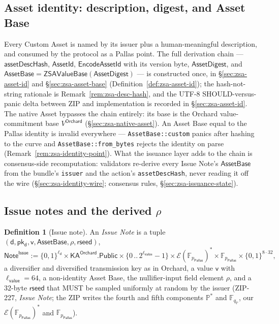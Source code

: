 \documentclass[11pt,a4paper]{article}
\theoremstyle{definition}
\newtheorem{definition}[theorem]{Definition}
\newcommand{\F}{\mathbb{F}}
\newcommand{\Pallas}{\ensuremath{\mathsf{Pallas}}}
\newcommand{\Ep}{\ensuremath{\mathcal{E}}}
\newcommand{\pkd}{\ensuremath{\mathsf{pk_d}}}
\begin{document}
\subsection{Asset identity: description, digest, and Asset Base}%
\label{sec:zsa-issuance-asset}

Every Custom Asset is named by its issuer plus a human-meaningful
description, and consumed by the protocol as a Pallas point. The full
derivation chain --- $\mathsf{assetDescHash}$, $\mathsf{AssetId}$,
$\mathsf{EncodeAssetId}$ with its version byte, $\mathsf{AssetDigest}$,
and $\mathsf{AssetBase} = \mathsf{ZSAValueBase}(\mathsf{AssetDigest})$ ---
is constructed once, in \S\ref{sec:zsa-asset-id} and
\S\ref{sec:zsa-asset-base} (Definition~\ref{def:zsa-asset-id}); the
hash-not-string rationale is Remark~\ref{rem:zsa-desc-hash}, and the UTF-8
SHOULD-versus-panic delta between ZIP and implementation is recorded in
\S\ref{sec:zsa-asset-id}. The native Asset bypasses the chain entirely:
its base is the Orchard value-commitment base $V^{\mathsf{Orchard}}$
(\S\ref{sec:zsa-native-asset}). An Asset Base equal to the Pallas identity
is invalid everywhere --- \texttt{AssetBase::custom} panics after hashing
to the curve and \texttt{AssetBase::from\_bytes} rejects the identity on
parse (Remark~\ref{rem:zsa-identity-point}). What the issuance layer adds
to the chain is consensus-side recomputation: validators re-derive every
Issue Note's $\mathsf{AssetBase}$ from the bundle's \texttt{issuer} and
the action's \texttt{assetDescHash}, never reading it off the wire
(\S\ref{sec:zsa-identity-wire}; consensus rules,
\S\ref{sec:zsa-issuance-state}).

\subsection{Issue notes and the derived $\rho$}%
\label{sec:zsa-issuance-notes}

\begin{definition}[Issue note]\label{def:zsa-issue-note}
An \emph{Issue Note} is a tuple
$(\mathsf{d}, \pkd, \mathsf{v}, \mathsf{AssetBase}, \rho,
\mathsf{rseed})$,
\[
\mathsf{Note}^{\mathsf{Issue}} :=
  \{0,1\}^{\ell_{\mathsf{d}}} \times
  \mathsf{KA}^{\mathsf{Orchard}}.\mathsf{Public} \times
  \{0\,..\,2^{\ell_{\mathsf{value}}}-1\} \times
  \Ep(\F_{p_{\Pallas}})^{\ast} \times
  \F_{p_{\Pallas}} \times
  \{0,1\}^{8 \cdot 32},
\]
a diversifier and diversified transmission key as in Orchard, a value
$\mathsf{v}$ with $\ell_{\mathsf{value}} = 64$, a non-identity Asset Base,
the nullifier-input field element $\rho$, and a $32$-byte
$\mathsf{rseed}$ that MUST be sampled uniformly at random by the issuer
(ZIP-227, \emph{Issue Note}; the ZIP writes the fourth and fifth
components $\mathbb{P}^{\ast}$ and $\F_{q_{\mathbb{P}}}$, our
$\Ep(\F_{p_{\Pallas}})^{\ast}$ and $\F_{p_{\Pallas}}$).
\end{definition}
\end{document}
